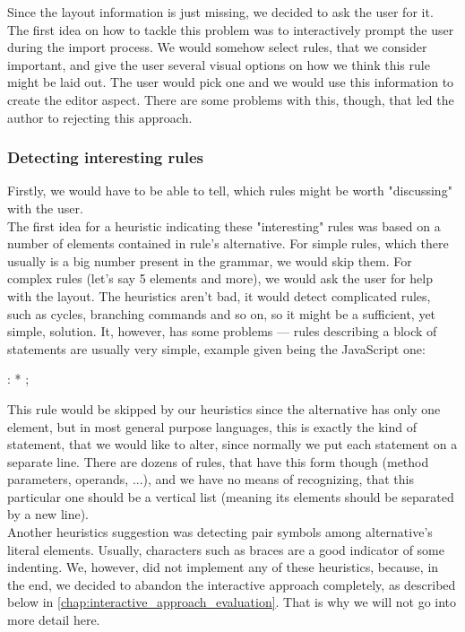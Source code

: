 Since the layout information is just missing, we decided to ask the user for it.
The first idea on how to tackle this problem was to interactively prompt the user during the import process.
We would somehow select rules, that we consider important, and give the user several visual options on how we think this rule might be laid out.
The user would pick one and we would use this information to create the editor aspect.
There are some problems with this, though, that led the author to rejecting this approach.

\subsubsection{Detecting interesting rules}

Firstly, we would have to be able to tell, which rules might be worth "discussing" with the user.
\\

The first idea for a heuristic indicating these "interesting" rules was based on a number of elements contained in rule's alternative.
For simple rules, which there usually is a big number present in the grammar, we would skip them.
For complex rules (let's say 5 elements and more), we would ask the user for help with the layout.
The heuristics aren't bad, it would detect complicated rules, such as cycles, branching commands and so on, so it might be a sufficient, yet simple, solution.
It, however, has some problems --- rules describing a block of statements are usually very simple, example given being the JavaScript one:

\begin{antlr}
	 : * ;
\end{antlr}

This rule would be skipped by our heuristics since the alternative has only one element, but in most general purpose languages, this is exactly the kind of statement, that we would like to alter, since normally we put each statement on a separate line.
There are dozens of rules, that have this form though (method parameters, operands, ...), and we have no means of recognizing, that this particular one should be a vertical list (meaning its elements should be separated by a new line).
\\

Another heuristics suggestion was detecting pair symbols among alternative's literal elements.
Usually, characters such as braces are a good indicator of some indenting.
We, however, did not implement any of these heuristics, because, in the end, we decided to abandon the interactive approach completely, as described below in \ref{chap:interactive_approach_evaluation}.
That is why we will not go into more detail here.

